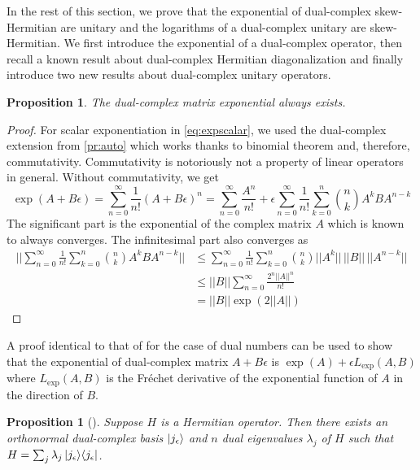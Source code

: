 \documentclass{article}
\newtheorem{proposition}[theorem]{Proposition}
\newcommand{\e}{\epsilon}
\newcommand\ketbra[2]{\ket{#1}\!\bra{#2}}
\begin{document}
In the rest of this section, we prove that the exponential of dual-complex skew-Hermitian are unitary and the logarithms of a dual-complex unitary are skew-Hermitian. We first introduce the exponential of a dual-complex operator, then recall a known result about dual-complex Hermitian diagonalization and finally introduce two new results about dual-complex unitary operators.

\begin{proposition}
The dual-complex matrix exponential always exists.
\end{proposition}
\begin{proof}
For scalar exponentiation in \ref{eq:expscalar}, we used the dual-complex extension from \ref{pr:auto} which works thanks to binomial theorem and, therefore, commutativity. Commutativity is notoriously not a property of linear operators in general. Without commutativity, we get
\begin{equation}
\exp(A + B \e) = \sum_{n=0}^\infty \frac 1 {n!} (A + B\e)^n = \sum_{n=0}^\infty \frac{A^n}{n!} + \e \sum_{n=0}^\infty \frac 1 {n!} \sum_{k=0}^n \binom n k A^k B A^{n-k}
\end{equation}
The significant part is the exponential of the complex matrix $A$ which is known to always converges. The infinitesimal part also converges as
\begin{equation}
\begin{split}
||\sum_{n=0}^\infty \frac 1 {n!} \sum_{k=0}^n \binom n k A^k B A^{n-k}|| &\leq \sum_{n=0}^\infty \frac 1 {n!} \sum_{k=0}^n \binom n k ||A^k||\, ||B||\, ||A^{n-k}||\\
&\leq ||B||\sum_{n=0}^\infty \frac{2^n ||A||^n}{n!}\\
&= ||B|| \exp(2||A||)
\end{split}
\end{equation}
\end{proof}

A proof identical to that of \cite{liu2025} for the case of dual numbers can be used to show that the exponential of dual-complex matrix $A + B\e$ is $\exp(A) + \e L_{\exp}(A, B)$ where $L_{\exp}(A, B)$ is the Fréchet derivative of the exponential function of $A$ in the direction of $B$.

\begin{proposition}[\cite{qi2021}]\label{pr:qi21}
 Suppose $H$ is a Hermitian operator. Then there exists an orthonormal dual-complex basis $\ket{j_\e}$ and $n$ dual eigenvalues $\lambda_j$ of $H$ such that $H = \sum_j \lambda_j \ketbra{j_\e}{j_\e}$.
\end{proposition}
\end{document}
